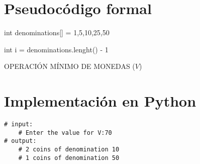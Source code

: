 \documentclass{article}
\begin{document}
\section{Pseudocódigo formal}
\begin{center}
    \begin{algorithm}[H]
        \SetAlgoLined
        \large
        int denominations[] = {1,5,10,25,50}\; 
        
        int i = denominations.lenght() - 1\; 

        \caption{OPERACIÓN MÍNIMO DE MONEDAS ($V$)}

    \end{algorithm}
\end{center}

\section{Implementación en Python}
\begin{verbatim}
# input:
    # Enter the value for V:70
# output:
    # 2 coins of denomination 10
    # 1 coins of denomination 50

\end{verbatim}




\end{document}
